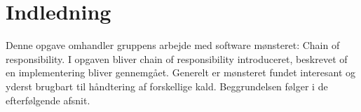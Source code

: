 \chapter{Indledning}\label{ch:introduction}
Denne opgave omhandler gruppens arbejde med software mønsteret: Chain of responsibility. I opgaven bliver chain of responsibility introduceret, beskrevet of en implementering bliver gennemgået. Generelt er mønsteret fundet interesant og yderst brugbart til håndtering af forskellige kald. Beggrundelsen følger i de efterfølgende afsnit.  